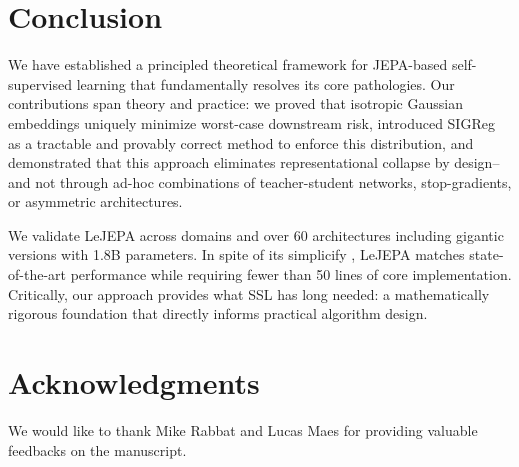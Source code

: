 
\section{Conclusion}
We have established a principled theoretical framework for JEPA-based self-supervised 
learning that fundamentally resolves its core pathologies. Our contributions span 
theory and practice: we proved that isotropic Gaussian embeddings uniquely minimize 
worst-case downstream risk, introduced SIGReg as a tractable and provably correct 
method to enforce this distribution, and demonstrated that this approach eliminates 
representational collapse by design--and not through ad-hoc combinations of teacher-student 
networks, stop-gradients, or asymmetric architectures.

We validate LeJEPA across domains and over $60$ architectures including gigantic versions with 1.8B parameters. In spite of its simplicify , LeJEPA matches state-of-the-art 
performance while requiring fewer than 50 lines of core implementation. Critically, 
our approach provides what SSL has long needed: a mathematically rigorous foundation 
that directly informs practical algorithm design.


\section*{Acknowledgments}
We would like to thank Mike Rabbat and
Lucas Maes for providing valuable feedbacks on the manuscript.

